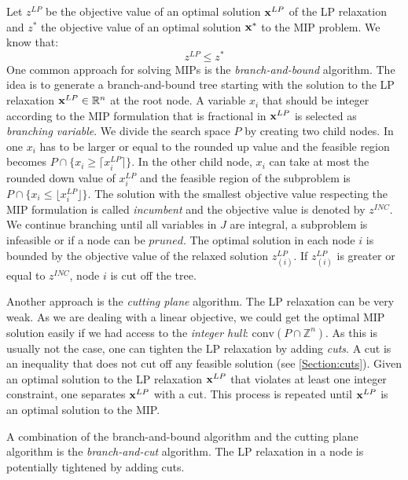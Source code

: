 Let $z^{LP}$ be the objective value of an optimal solution $\bold{x}^{LP}$ of the LP relaxation and $z^*$ the objective value of an optimal solution $\bold{x^*}$ to the MIP problem. We know that: 
\begin{equation*} \label{Eq:bound}
    z^{LP} \leq z^*
\end{equation*}
One common approach for solving MIPs is the \textit{branch-and-bound} algorithm. The idea is to generate a branch-and-bound tree starting with the solution to the LP relaxation $\bold x^{LP} \in \mathbb{R}^n$ at the root node. A variable $x_i$ that should be integer according to the MIP formulation that is fractional in $\bold x^{LP}$ is selected as \textit{branching variable}. We divide the search space $P$ by creating two child nodes. In one $x_i$ has to be larger or equal to the rounded up value and the feasible region becomes $P \cap \{x_i \geq \lceil x_i^{LP} \rceil \}$. In the other child node, $x_i$ can take at most the rounded down value of $x_i^{LP}$ and the feasible region of the subproblem is $P \cap \{x_i \leq \lfloor x_i^{LP} \rfloor \}$. The solution with the smallest objective value respecting the MIP formulation is called \textit{incumbent} and the objective value is denoted by $z^{INC}$. We continue branching until all variables in $J$ are integral, a subproblem is infeasible or if a node can be $pruned$. The optimal solution in each node $i$ is bounded by the objective value of the relaxed solution $z^{LP}_{(i)}$. If $z^{LP}_{(i)}$ is greater or equal to $z^{INC}$, node $i$ is cut off the tree. 


Another approach is the \textit{cutting plane} algorithm. The LP relaxation can be very weak. As we are dealing with a linear objective, we could get the optimal MIP solution easily if we had access to the \textit{integer hull}: $\text{conv}(P \cap \mathbb{Z}^n)$. As this is usually not the case, one can tighten the LP relaxation by adding \textit{cuts}. A cut is an inequality that does not cut off any feasible solution (see \cref{Section:cuts}). Given an optimal solution to the LP relaxation $\bold x^{LP}$ that violates at least one integer constraint, one separates $\bold x^{LP}$ with a cut. This process is repeated until $\bold x^{LP}$ is an optimal solution to the MIP.

A combination of the branch-and-bound algorithm and the cutting plane algorithm is the \textit{branch-and-cut} algorithm. The LP relaxation in a node is potentially tightened by adding cuts. \cite{integer_programming}

